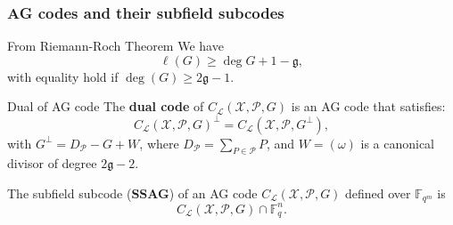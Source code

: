 \documentclass[
10pt, %
%
aspectratio=169, %
]{beamer}
\theoremstyle{plain}%
\theoremstyle{definition}
\theoremstyle{remark}
\newcommand{\calP}{\mathcal{P}}
\newcommand{\calL}{\mathcal{L}}
\newcommand{\calC}{\mathcal{C}}
\newcommand{\calX}{\mathcal{X}}
\newcommand{\fqm}{\mathbb{F}_{q^m}}
\newcommand{\fq}{\mathbb{F}_{q}}
\newcommand{\Span}[1]{\operatorname{Span}\left\lbrace #1\right\rbrace }
\begin{document}
\begin{frame}
	\frametitle{AG codes and their subfield subcodes }
\begin{block}{From Riemann-Roch Theorem \cite{Sti09}}
	We have 
	\[\ell(G)\geq \deg G +1-\mathfrak{g},\]
	with equality hold if $\deg (G) \geq 2\mathfrak{g} -1$.
\end{block}
		\begin{block}{Dual of AG code }
		The \textbf{dual code} of $C_{\calL}(\calX,\calP,G)$ is an AG code that satisfies:
		\[ C_{\calL}(\calX,\calP,G)^{\perp} = C_{\calL}(\calX,\calP,G^{\perp}),\]
		with $G^{\perp} = D_{\calP}-G+W$, where $D_{\calP} = \sum\limits_{P \in \calP} P$, and $W=(\omega)$ is a canonical divisor of degree $2\mathfrak{g} - 2$.
	\end{block}
	\vspace{-0.8em}
\begin{tcolorbox}[colback= aliceblue]
	The subfield subcode (\textbf{SSAG}) of an AG code $C_{\calL}(\calX,\calP,G)$ defined over $\fqm$ is
	\[C_{\calL}(\calX,\calP,G)\cap \fq^n.\]
\end{tcolorbox}
\end{frame}
\end{document}
